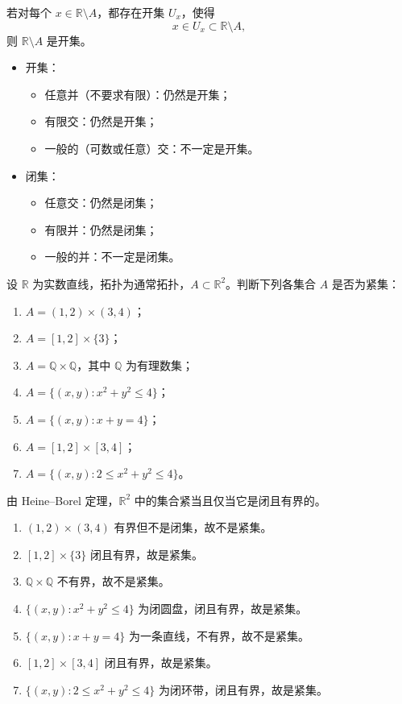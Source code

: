 若对每个 $x\in\mathbb{R}\setminus A$，都存在开集 $U_x$，使得
\[
x\in U_x\subset\mathbb{R}\setminus A,
\]
则 $\mathbb{R}\setminus A$ 是开集。
\begin{dxtips}
    

\begin{itemize}
  \item 开集：
  \begin{itemize}
    \item 任意并（不要求有限）：仍然是开集；
    \item 有限交：仍然是开集；
    \item 一般的（可数或任意）交：不一定是开集。
  \end{itemize}

  \item 闭集：
  \begin{itemize}
    \item 任意交：仍然是闭集；
    \item 有限并：仍然是闭集；
    \item 一般的并：不一定是闭集。
  \end{itemize}
\end{itemize}
\end{dxtips}
\begin{homework}[12]
设 $\mathbb{R}$ 为实数直线，拓扑为通常拓扑，$A\subset \mathbb{R}^2$。判断下列各集合 $A$ 是否为紧集：

\begin{enumerate}
  \item $A=(1,2)\times(3,4)$；
  \item $A=[1,2]\times\{3\}$；
  \item $A=\mathbb{Q}\times\mathbb{Q}$，其中 $\mathbb{Q}$ 为有理数集；
  \item $A=\{(x,y):x^{2}+y^{2}\le 4\}$；
  \item $A=\{(x,y):x+y=4\}$；
  \item $A=[1,2]\times[3,4]$；
  \item $A=\{(x,y):2\le x^{2}+y^{2}\le 4\}$。
\end{enumerate}
\end{homework}
\begin{solution}
由 Heine--Borel 定理，$\mathbb{R}^2$ 中的集合紧当且仅当它是闭且有界的。
\begin{enumerate}
  \item $(1,2)\times(3,4)$ 有界但不是闭集，故不是紧集。
  \item $[1,2]\times\{3\}$ 闭且有界，故是紧集。
  \item $\mathbb{Q}\times\mathbb{Q}$ 不有界，故不是紧集。
  \item $\{(x,y):x^{2}+y^{2}\le 4\}$ 为闭圆盘，闭且有界，故是紧集。
  \item $\{(x,y):x+y=4\}$ 为一条直线，不有界，故不是紧集。
  \item $[1,2]\times[3,4]$ 闭且有界，故是紧集。
  \item $\{(x,y):2\le x^{2}+y^{2}\le 4\}$ 为闭环带，闭且有界，故是紧集。
\end{enumerate}
\end{solution}
